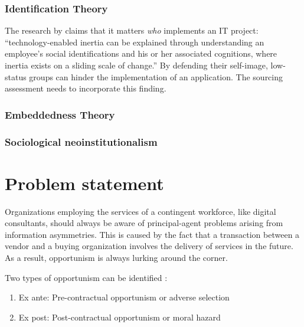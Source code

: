 \documentclass[12pt]{article}
\providecommand{\tightlist}{%
  \setlength{\itemsep}{0pt}\setlength{\parskip}{0pt}}
\begin{document}
\hypertarget{identification-theory}{%
\subsubsection{Identification Theory}\label{identification-theory}}

The research by \citet[311-313]{schwarz2005} claims that it matters
\emph{who} implements an IT project: ``technology-enabled inertia can be
explained through understanding an employee's social identifications and
his or her associated cognitions, where inertia exists on a sliding
scale of change.'' By defending their self-image, low-status groups can
hinder the implementation of an application. The sourcing assessment
needs to incorporate this finding.

\hypertarget{embeddedness-theory}{%
\subsubsection{Embeddedness Theory}\label{embeddedness-theory}}

\citep[ 14-16]{armbruster2006}

\hypertarget{sociological-neoinstitutionalism}{%
\subsubsection{Sociological
neoinstitutionalism}\label{sociological-neoinstitutionalism}}

\citep[ 8-11]{armbruster2006}

\hypertarget{problem-statement}{%
\section{Problem statement}\label{problem-statement}}

Organizations employing the services of a contingent workforce, like
digital consultants, should always be aware of principal-agent problems
arising from information asymmetries. This is caused by the fact that a
transaction between a vendor and a buying organization involves the
delivery of services in the future. As a result, opportunism is always
lurking around the corner.

Two types of opportunism can be identified \citet[242]{clark1993}:

\begin{enumerate}
\def\labelenumi{\arabic{enumi}.}
\tightlist
\item
  Ex ante: Pre-contractual opportunism or adverse selection
\item
  Ex post: Post-contractual opportunism or moral hazard
\end{enumerate}
\end{document}
